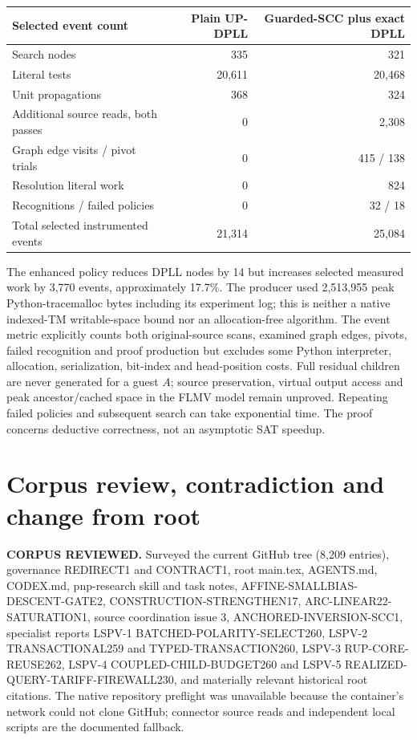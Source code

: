 \documentclass[11pt]{article}
\begin{document}
\begin{center}\begin{tabular}{lrr}\toprule
Selected event count&Plain UP-DPLL&Guarded-SCC plus exact DPLL\\\midrule
Search nodes&335&321\\
Literal tests&20,611&20,468\\
Unit propagations&368&324\\
Additional source reads, both passes&0&2,308\\
Graph edge visits / pivot trials&0&415 / 138\\
Resolution literal work&0&824\\
Recognitions / failed policies&0&32 / 18\\
Total selected instrumented events&21,314&25,084\\\bottomrule
\end{tabular}\end{center}
The enhanced policy reduces DPLL nodes by 14 but increases selected measured work by 3,770 events, approximately 17.7\%. The producer used 2,513,955 peak Python-tracemalloc bytes including its experiment log; this is neither a native indexed-TM writable-space bound nor an allocation-free algorithm. The event metric explicitly counts both original-source scans, examined graph edges, pivots, failed recognition and proof production but excludes some Python interpreter, allocation, serialization, bit-index and head-position costs. Full residual children are never generated for a guest $A$; source preservation, virtual output access and peak ancestor/cached space in the FLMV model remain unproved. Repeating failed policies and subsequent search can take exponential time. The proof concerns deductive correctness, not an asymptotic SAT speedup.

\section{Corpus review, contradiction and change from root}
\textbf{CORPUS REVIEWED.} Surveyed the current GitHub tree (8,209 entries), governance REDIRECT1 and CONTRACT1, root main.tex, AGENTS.md, CODEX.md, pnp-research skill and task notes, AFFINE-SMALLBIAS-DESCENT-GATE2, CONSTRUCTION-STRENGTHEN17, ARC-LINEAR22-SATURATION1, source coordination issue 3, ANCHORED-INVERSION-SCC1, specialist reports LSPV-1 BATCHED-POLARITY-SELECT260, LSPV-2 TRANSACTIONAL259 and TYPED-TRANSACTION260, LSPV-3 RUP-CORE-REUSE262, LSPV-4 COUPLED-CHILD-BUDGET260 and LSPV-5 REALIZED-QUERY-TARIFF-FIREWALL230, and materially relevant historical root citations. The native repository preflight was unavailable because the container's network could not clone GitHub; connector source reads and independent local scripts are the documented fallback.
\end{document}
